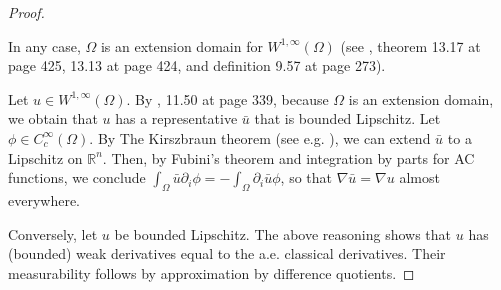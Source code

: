 \documentclass[english,a4paper,9pt,oneside]{scrbook}	%
\theoremstyle{break}
\newenvironment{mproof}[1][\proofname]{%
  \begin{proof}[#1]$ $\par\nobreak\ignorespaces
}{%
  \end{proof}
}
\renewcommand*{\proofname}{Proof}
\theoremstyle{remark}
\newcommand{\ds}{\displaystyle}
\newcommand{\cc}{\subset\subset}
\begin{document}
\begin{appendices}
\begin{mproof}
%
%
%
%

In any case, $\Omega$ is an extension domain for $W^{1,\infty}(\Omega)$ (see \cite{leoni}, theorem 13.17 at page 425, 13.13 at page 424, and definition 9.57 at page 273).

Let $u \in  W^{1,\infty}(\Omega)$. By \cite{leoni}, 11.50 at page 339, because $\Omega$ is an extension domain, we obtain that $u$ has a representative $\bar{u}$ that is bounded Lipschitz. Let $\phi \in C_c^\infty(\Omega)$. By The Kirszbraun theorem (see e.g. \cite{kirszbraun}), we can extend $\bar{u}$ to a Lipschitz on $\mathbb{R}^n$. Then, by Fubini's theorem and integration by parts for AC functions, we conclude $\ds \int_\Omega\bar{u}\partial_i\phi =-\int_{\Omega} \partial_i \bar{u} \phi $, so that $\nabla \bar{u} = \nabla u$ almost everywhere.

Conversely, let $u$ be bounded Lipschitz. The above reasoning shows that $u$ has (bounded) weak derivatives equal to the a.e. classical derivatives. Their measurability follows by approximation by difference quotients.
\end{mproof}


\end{appendices}
\end{document}
